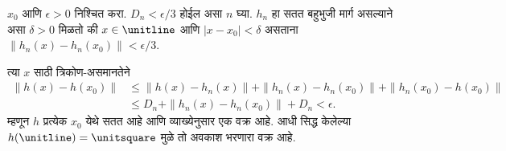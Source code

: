 \documentclass[../../../include/open-logic-section]{subfiles}
\begin{document}
$x_0$ आणि $\epsilon>0$ निश्चित करा.
$D_n<\epsilon/3$ होईल असा $n$ घ्या.
$h_n$ हा सतत बहुभुजी मार्ग असल्याने असा $\delta>0$
मिळतो की $x\in\unitline$ आणि $|x-x_0|<\delta$
असताना $\|h_n(x)-h_n(x_0)\|<\epsilon/3$.

त्या $x$ साठी त्रिकोण-असमानतेने
\begin{align*}
\|h(x)-h(x_0)\|
&\leq\|h(x)-h_n(x)\|+\|h_n(x)-h_n(x_0)\|
+\|h_n(x_0)-h(x_0)\|\\
&\leq D_n+\|h_n(x)-h_n(x_0)\|+D_n
<\epsilon.
\end{align*}
म्हणून $h$ प्रत्येक $x_0$ येथे सतत आहे आणि व्याख्येनुसार
एक वक्र आहे. आधी सिद्ध केलेल्या
$h(\unitline)=\unitsquare$ मुळे तो अवकाश भरणारा वक्र आहे.
\end{document}
